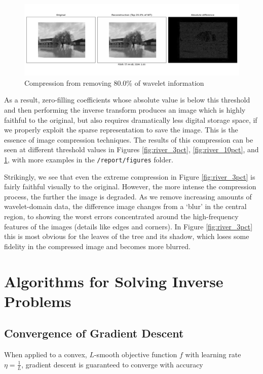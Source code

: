 \documentclass[12pt]{article}
\begin{document}
\begin{figure}[htp]
    \includegraphics[scale=0.35]{figures/river_img_compressed_0.200.png}
    \caption{Compression from removing 80.0\% of wavelet information}
    \label{fig:river_20pct}
\end{figure}

As a result, zero-filling coefficients whose absolute value is below this threshold and then performing the inverse transform produces an image which is highly faithful to the original,
but also requires dramatically less digital storage space, if we properly exploit the sparse representation to save the image.
This is the essence of image compression techniques.
The results of this compression can be seen at different threshold values in Figures \ref{fig:river_3pct}, \ref{fig:river_10pct}, and \ref{fig:river_20pct},
with more examples in the \texttt{/report/figures} folder.

Strikingly, we see that even the extreme compression in Figure \ref{fig:river_3pct} is fairly faithful visually to the original.
However, the more intense the compression process, the further the image is degraded.
As we remove increasing amounts of wavelet-domain data, the difference image changes from a `blur' in the central region,
to showing the worst errors concentrated around the high-frequency features of the images (details like edges and corners).
In Figure \ref{fig:river_3pct} this is most obvious for the leaves of the tree and its shadow,
which loses some fidelity in the compressed image and becomes more blurred.

\section{Algorithms for Solving Inverse Problems}
\subsection{Convergence of Gradient Descent}

When applied to a convex, $L$-smooth objective function $f$ with learning rate $\eta=\frac{1}{L}$,
gradient descent is guaranteed to converge with accuracy
\end{document}
